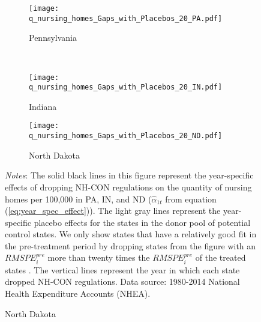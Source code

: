 \documentclass[../Main.tex]{subfiles}
\begin{document}
\newpage
\begin{figure}[t]
	\begin{center}
	\caption{\label{fig:q_nursing_homes_gaps} \centering Year-Specific Effects of Dropping NH-CON on the Quantity of Nursing Homes Per 100,000 ($\hat{\alpha}_{1t}$)}
    \begin{subfigure}[b]{\textwidth} \centering
    \caption{Pennsylvania}\texttt{[image: q\_nursing\_homes\_Gaps\_with\_Placebos\_20\_PA.pdf]}
    \end{subfigure}\\
    \vspace{.4cm}
    \begin{subfigure}[b]{.48\textwidth} \centering
    \caption{Indiana}\texttt{[image: q\_nursing\_homes\_Gaps\_with\_Placebos\_20\_IN.pdf]}
    \end{subfigure}\quad%
    \begin{subfigure}[b]{.48\textwidth} \centering
    \caption{North Dakota}\texttt{[image: q\_nursing\_homes\_Gaps\_with\_Placebos\_20\_ND.pdf]}
    \end{subfigure}
    \end{center}
    \footnotesize
		\textit{Notes}: The solid black lines in this figure represent the year-specific effects of dropping NH-CON regulations on the quantity of nursing homes per 100,000 in PA, IN, and ND ($\hat{\alpha}_{1t}$ from equation (\ref{eq:year_spec_effect})). The light gray lines represent the year-specific placebo effects for the states in the donor pool of potential control states. We only show states that have a relatively good fit in the pre-treatment period by dropping states from the figure with an $RMSPE_i^{pre}$ more than twenty times the $RMSPE_i^{pre}$ of the treated states \citep{abadie2010synthetic}. The vertical lines represent the year in which each state dropped NH-CON regulations. Data source: 1980-2014 National Health Expenditure Accounts (NHEA).
\end{figure}
\clearpage
\end{document}
